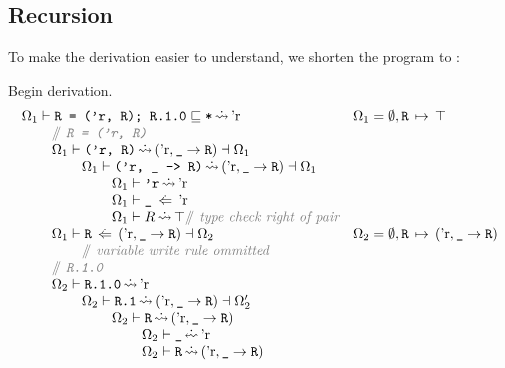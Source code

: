 \documentclass[12pt,twoside]{report}
\begin{document}
\subsection{Recursion}
\label{appendix:recursionderivation}
To make the derivation easier to understand, we shorten the program to :

Begin derivation.
{
  \smaller
  \[\begin{array}{ll}
    \Omega_1 \vdash \mono{R = ('r, R); R.1.0} \subtype \mono{*} \erasedreadarrow \atom{r} &
      \Omega_1 = \emptyset, \absmapm{R}{\top} \\
    \otab \ocomment{\mono{R = ('r, R)}} \\
    \otab \Omega_1 \vdash \mono{('r, R)} \erasedreadarrow (\atom{r}, \mono{\_} \rightarrow \mono{R}) \dashv \Omega_1 \\
    \otab\otab \Omega_1 \vdash \mono{('r, \_ -> R)} \erasedreadarrow (\atom{r}, \mono{\_} \rightarrow \mono{R}) \dashv \Omega_1 \\
    \otab\otab\otab \Omega_1 \vdash \mono{'r} \erasedreadarrow \atom{r} \\
    \otab\otab\otab \Omega_1 \vdash \mono{\_} \writearrowabs \atom{r} \\
    \otab\otab\otab \Omega_1 \vdash R \erasedreadarrow \top \ocomment{type check right of pair} \\
    \otab \Omega_1 \vdash \mono{R} \writearrowabs (\atom{r}, \mono{\_} \rightarrow \mono{R}) \dashv \Omega_2 &
      \Omega_2 = \emptyset,\absmapm{R}{(\atom{r}, \mono{\_} \rightarrow \mono{R})} \\
    \otab\otab \ocomment{variable write rule ommitted} \\

    \otab \ocomment{\mono{R.1.0}} \\
    \otab \Omega_2 \vdash \mono{R.1.0} \erasedreadarrow \atom{r} \\
    \otab\otab \Omega_2 \vdash \mono{R.1} \erasedreadarrow (\atom{r}, \mono{\_} \rightarrow \mono{R})  \dashv \Omega_2' \\
    \otab\otab\otab \Omega_2 \vdash \mono{R} \erasedreadarrow (\atom{r}, \mono{\_} \rightarrow \mono{R}) \\
    \otab\otab\otab\otab \Omega_2 \vdash \mono{\_} \erasedwritearrow \atom{r} \\
    \otab\otab\otab\otab \Omega_2 \vdash \mono{R} \erasedreadarrow (\atom{r}, \mono{\_} \rightarrow \mono{R}) \\



  \end{array}\]
}
\end{document}
